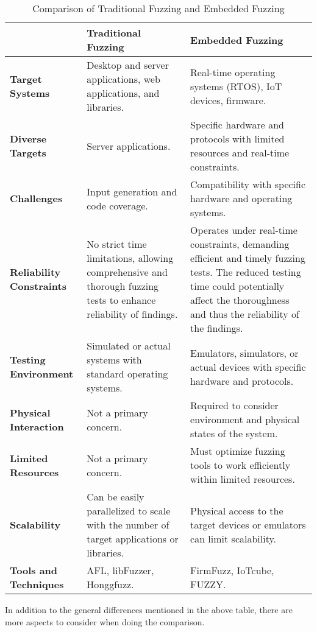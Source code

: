 \begin{table}[h!]
\centering
\begin{tabularx}{\textwidth}{@{}>{\raggedright\arraybackslash}p{3cm}X X@{}}
\toprule
& \textbf{Traditional Fuzzing} & \textbf{Embedded Fuzzing} \\
\midrule
\textbf{Target Systems} & Desktop and server applications, web applications, and libraries. & Real-time operating systems (RTOS), IoT devices, firmware. \\
\addlinespace
\textbf{Diverse Targets} & Server applications. & Specific hardware and protocols with limited resources and real-time constraints. \\
\addlinespace
\textbf{Challenges} & Input generation and code coverage. & Compatibility with specific hardware and operating systems. \\
\addlinespace
\textbf{Reliability Constraints} & No strict time limitations, allowing comprehensive and thorough fuzzing tests to enhance reliability of findings. & Operates under real-time constraints, demanding efficient and timely fuzzing tests. The reduced testing time could potentially affect the thoroughness and thus the reliability of the findings. \\
\addlinespace
\textbf{Testing Environment} & Simulated or actual systems with standard operating systems. & Emulators, simulators, or actual devices with specific hardware and protocols. \\
\addlinespace
\textbf{Physical Interaction} & Not a primary concern. & Required to consider environment and physical states of the system. \\
\addlinespace
\textbf{Limited Resources} & Not a primary concern. & Must optimize fuzzing tools to work efficiently within limited resources. \\
\addlinespace
\textbf{Scalability} & Can be easily parallelized to scale with the number of target applications or libraries. & Physical access to the target devices or emulators can limit scalability. \\
\addlinespace
\textbf{Tools and Techniques} & AFL, libFuzzer, Honggfuzz. & FirmFuzz, IoTcube, FUZZY. \\
\bottomrule
\end{tabularx}
\caption{Comparison of Traditional Fuzzing and Embedded Fuzzing}
\label{tab:fuzzing_comparison}
\end{table}

In addition to the general differences mentioned in the above table, there are more aspects to consider
when doing the comparison.

